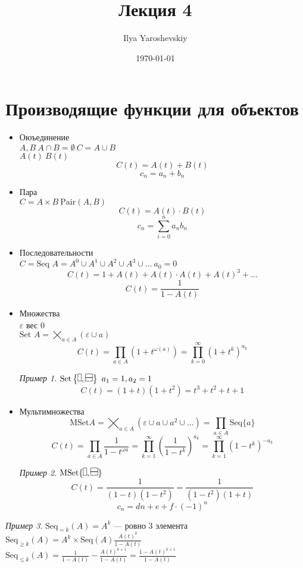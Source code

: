 \documentclass[english]{article}
\author{Ilya Yaroshevskiy}
\date{\today}
\title{Лекция 4}
\theoremstyle{plain}
\theoremstyle{remark}
\newtheorem*{examp}{Пример}
\theoremstyle{definition}
\begin{document}
\maketitle
\tableofcontents

\newcommand{\vdomino}{
\begin{tikzpicture}
\draw (0, 0) rectangle (0.15,0.3);
\end{tikzpicture}}
\newcommand{\hdomino}{
\begin{tikzpicture}
\draw (0, 0) rectangle (0.3,0.15);
\draw (0, 0.15) rectangle (0.3,0.3);
\end{tikzpicture}}

\section{Производящие функции для объектов}
\label{sec:orgc73f112}
\begin{itemize}
\item Оюъединение \\
\(A, B\ A \cap B = \emptyset\ C = A \cup B\) \\
\(A(t)\ B(t)\)
\[ C(t) = A(t) + B(t)\]
\[ c_n = a_n + b_n \]
\item Пара \\
\(C = A \times B\ \text{Pair}(A, B)\)
\[C(t) = A(t) \cdot B(t)\] 
\[ c_n = \sum_{i = 0}^na_nb_n \]
\item Последовательности \\
\(C = \text{Seq }A = A^0 \cup A^1 \cup A^2 \cup A^3 \cup \dots\ a_0 = 0\)
\[ C(t) = 1 + A(t) + A(t)\cdot A(t) + A(t)^3 + \dots \]
\[ C(t) = \frac{1}{1 - A(t)} \]
\item Множества \\
\(\varepsilon\) вес \(0\) \\
\(\text{Set }A = \bigtimes_{a \in A} (\varepsilon \cup a)\) \\
\[ C(t) = \prod_{a \in A}(1 + t^{\omega(a)}) = \prod_{k = 0}^\infty (1 + t^k)^{a_k} \]
\begin{examp}
\(\text{Set}\left\{\vdomino, \hdomino\right\}\ a_1 = 1,a_2 = 1\) \\
\[ C(t) = (1 + t)(1 + t^2) = t^3 + t^2 + t + 1 \]
\end{examp}
\item Мультимножества \\
\[\text{MSet} A = \bigtimes_{a \in A}(\varepsilon \cup a \cup a^2 \cup \dots) = \prod_{a \in A}\text{Seq}\{a\}\]
\[ C(t) = \prod_{a \in A}\frac{1}{1 - t^{\omega{a}}} = \prod_{k = 1}^\infty\left(\frac{1}{1 - t^k}\right)^{a_k} = \prod_{k = 1}^\infty(1 - t^k)^{-a_k}\]
\begin{examp}
\(\text{MSet}\{\vdomino, \hdomino\}\)
\[ C(t) = \frac{1}{(1 - t)(1 - t^2)} = \frac{1}{(1 - t^2)(1 + t)} \]
\[ c_n = dn + e + f\cdot(-1)^n \]
\end{examp}
\end{itemize}
\begin{examp}
\(\text{Seq}_{=k}(A) = A^k\) --- ровно 3 элемента \\
\(\text{Seq}_{\ge k}(A) = A^k \times \text{Seq}(A)\frac{A(t)^k}{1 - A(t)}\) \\
\(\text{Seq}_{\le k}(A) = \frac{1}{1 - A(t)} - \frac{A(t)^{k + 1}}{1 - A(t)} = \frac{1 - A(t)^{k + 1}}{1 - A(t)}\)
\end{examp}
\end{document}
